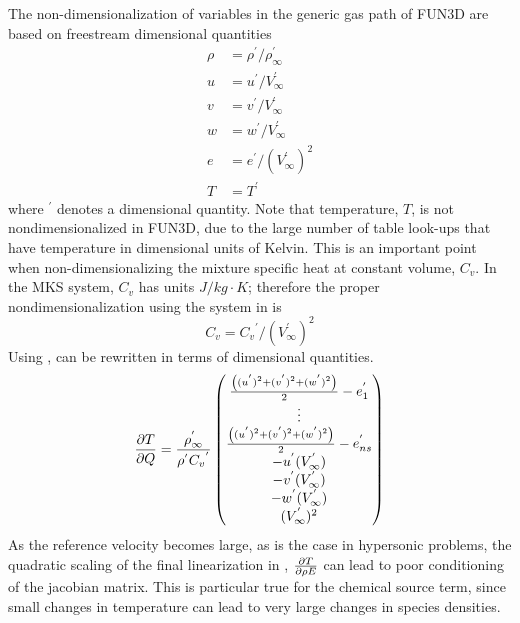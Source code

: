 The non-dimensionalization of variables in the generic gas path of FUN3D are
based on freestream dimensional quantities
\begin{equation}
  \begin{aligned}
    \rho &= \rho^{'} / \rho^{'}_{\infty} \\
    u &= u^{'} / V^{'}_{\infty} \\
    v &= v^{'} / V^{'}_{\infty} \\
    w &= w^{'} / V^{'}_{\infty} \\
    e &= e^{'} / \left( V^{'}_{\infty} \right)^2 \\
    T &= T^{'}
  \end{aligned}
  \label{nondim-gg}
\end{equation}
where $^{'}$ denotes a dimensional quantity. Note that temperature, $T$, is not
nondimensionalized in FUN3D, due to the large number of table look-ups that have
temperature in dimensional units of Kelvin.  This is an important point when
non-dimensionalizing the mixture specific heat at constant volume, $C_v$.  In
the MKS system, $C_v$ has units $J/kg \cdot K$; therefore the proper
nondimensionalization using the system in  is
\begin{equation}
  C_v = {C_v}^{'}/\left( V^{'}_{\infty} \right)^2
  \label{cv-nondim}
\end{equation}
Using ,  can be rewritten in
terms of dimensional quantities.
\begin{equation}
  \frac{\partial T}{\partial Q} =
  \frac{\rho^{'}_{\infty}}{\rho^{'} {C_v}^{'}}
  \begin{pmatrix}
    \frac{\left( (u^{'})^2 + (v^{'})^2 + (w^{'})^2 \right)}{2} - e^{'}_1 \\
    \vdots \\
    \frac{\left( (u^{'})^2 + (v^{'})^2 + (w^{'})^2 \right)}{2} - e^{'}_{ns} \\
    -u^{'}(V^{'}_{\infty}) \\
    -v^{'}(V^{'}_{\infty}) \\
    -w^{'}(V^{'}_{\infty}) \\
    (V^{'}_{\infty})^2
  \end{pmatrix}
  \label{tjac-dim}
\end{equation}
As the reference velocity becomes large, as is the case in hypersonic problems,
the quadratic scaling of the final linearization in ,
$\frac{\partial T}{\partial \rho E}$ can lead to poor conditioning of the jacobian matrix.  This is
particular true for the chemical source term, since small changes in temperature
can lead to very large changes in species densities.


